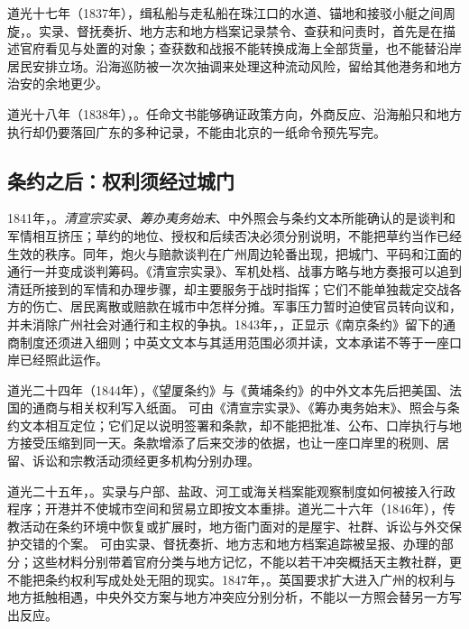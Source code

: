 道光十七年（1837年），缉私船与走私船在珠江口的水道、锚地和接驳小艇之间周旋，。实录、督抚奏折、地方志和地方档案记录禁令、查获和问责时，首先是在描述官府看见与处置的对象；查获数和战报不能转换成海上全部货量，也不能替沿岸居民安排立场。沿海巡防被一次次抽调来处理这种流动风险，留给其他港务和地方治安的余地更少。

道光十八年（1838年），。任命文书能够确证政策方向，外商反应、沿海船只和地方执行却仍要落回广东的多种记录，不能由北京的一纸命令预先写完。

\subsection{条约之后：权利须经过城门}

1841年，。\textit{清宣宗实录}、\textit{筹办夷务始末}、中外照会与条约文本所能确认的是谈判和军情相互挤压；草约的地位、授权和后续否决必须分别说明，不能把草约当作已经生效的秩序。同年，炮火与赔款谈判在广州周边轮番出现，把城门、平码和江面的通行一并变成谈判筹码。《清宣宗实录》、军机处档、战事方略与地方奏报可以追到清廷所接到的军情和办理步骤，却主要服务于战时指挥；它们不能单独裁定交战各方的伤亡、居民离散或赔款在城市中怎样分摊。军事压力暂时迫使官员转向议和，并未消除广州社会对通行和主权的争执。1843年，，正显示《南京条约》留下的通商制度还须进入细则；中英文文本与其适用范围必须并读，文本承诺不等于一座口岸已经照此运作。

道光二十四年（1844年），《望厦条约》与《黄埔条约》的中外文本先后把美国、法国的通商与相关权利写入纸面。 可由《清宣宗实录》、《筹办夷务始末》、照会与条约文本相互定位；它们足以说明签署和条款，却不能把批准、公布、口岸执行与地方接受压缩到同一天。条款增添了后来交涉的依据，也让一座口岸里的税则、居留、诉讼和宗教活动须经更多机构分别办理。

道光二十五年，。实录与户部、盐政、河工或海关档案能观察制度如何被接入行政程序；开港并不使城市空间和贸易立即按文本重排。道光二十六年（1846年），传教活动在条约环境中恢复或扩展时，地方衙门面对的是屋宇、社群、诉讼与外交保护交错的个案。 可由实录、督抚奏折、地方志和地方档案追踪被呈报、办理的部分；这些材料分别带着官府分类与地方记忆，不能以若干冲突概括天主教社群，更不能把条约权利写成处处无阻的现实。1847年，。英国要求扩大进入广州的权利与地方抵触相遇，中央外交方案与地方冲突应分别分析，不能以一方照会替另一方写出反应。

